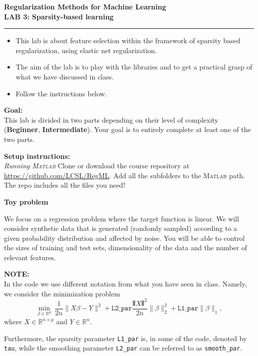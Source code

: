 \documentclass[DIN, pagenumber=false, fontsize=11pt, parskip=half]{scrartcl}
\newcommand{\MATLAB}{\textsc{Matlab}\xspace}
\newcommand{\mytitle}[1]{{\noindent\LARGE\textbf{#1}}}
\newcommand{\mysection}[1]{\noindent\large\textbf{#1}}
\begin{document}
\noindent\textbf{Regularization Methods for Machine Learning} \\

\mytitle{LAB 3: Sparsity-based learning}\\
\rule{\textwidth}{1pt}
\begin{itemize}\itemsep1pt \parskip0pt 
  \item This lab is about feature selection within the framework of sparsity based regularization, using elastic net regularization.
  \item The aim of the lab is to play with the libraries and to get a practical grasp of what we have discussed in class.
  \item Follow the instructions below.
\end{itemize}

\begin{framed}
\textbf{\textbf{Goal}:} \\
This lab is divided in two parts depending on their level of complexity (\textbf{Beginner}, \textbf{Intermediate}).
Your goal is to entirely complete at least one of the two parts.
\end{framed}

\begin{framed}
\textbf{\textbf{Setup instructions}:} \\
\textit{Running \MATLAB}
Clone or download the course repository at \url{https://github.com/LCSL/RegML}. Add all the subfolders to the \MATLAB path. The repo includes all the files you need!
\end{framed}

\mysection{Toy problem}

We focus on a regression problem where the target function is linear.
We will consider synthetic data that is generated (randomly sampled) according to a given probability distribution and affected by noise.
You will be able to control the sizes of training and test sets, dimensionality of the data and the number of relevant features.

\begin{framed}
\textbf{NOTE:} \\
In the code we use different notation from what you have seen in class. Namely, we consider the minimization problem
\begin{equation*}
\min_{\beta\in \mathbb{R}^p} \  \frac{1}{2n} \|X\beta-Y\|^2 +
\texttt{L2\_par} \frac{\VERT X \VERT^2}{2n}\|\beta\|^2_2 +
\texttt{L1\_par}\|\beta\|_1 ,
\end{equation*}
where $X \in \mathbb{R}^{n \times p}$ and $Y \in \mathbb{R}^n$.

Furthermore, the sparsity parameter \texttt{L1\_par} is, in some of the code, denoted by \texttt{tau}, while the smoothing parameter \texttt{L2\_par} can be referred to as \texttt{smooth\_par}.
\end{framed}
\end{document}
